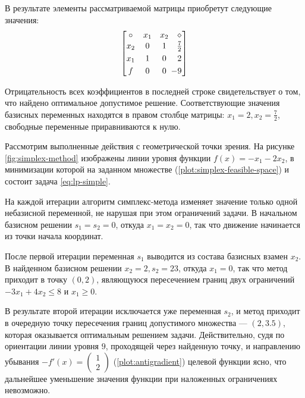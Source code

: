 В результате элементы рассматриваемой матрицы приобретут следующие
значения:
\begin{equation*}
  \begin{bmatrix}
    \circ & x_1 & x_2 & \diamond \vspace{1pt}\\
    x_2 & 0 & 1 & \frac{7}{2} \vspace{3pt}\\
    x_1 & 1 & 0 & 2 \vspace{3pt}\\
    f & 0 & 0 & \mm{9}
  \end{bmatrix}
\end{equation*}

Отрицательность всех коэффициентов в последней строке свидетельствует
о том, что найдено оптимальное допустимое решение. Соответствующие
значения базисных переменных находятся в правом столбце матрицы: $x_1
= 2, x_2 = \frac{7}{2}$, свободные переменные приравниваются к нулю.

Рассмотрим выполненные действия с геометрической точки зрения. На
рисунке \ref{fig:simplex-method} изображены линии уровня функции $f(x)
= -x_1-2x_2$, в минимизации которой на заданном множестве
(\ref{plot:simplex-feasible-space}) и состоит задача
\eqref{eq:lp-simple}.

На каждой итерации алгоритм симплекс-метода изменяет значение только
одной небазисной переменной, не нарушая при этом ограничений задачи. В
начальном базисном решении $s_1 = s_2 = 0$, откуда $x_1 = x_2 = 0$,
так что движение начинается из точки начала координат. 

После первой итерации переменная $s_1$ выводится из состава базисных
взамен $x_2$. В найденном базисном решении $x_2 = 2, s_2 = 23$, откуда
$x_1 = 0$, так что метод приходит в точку $(0, 2)$, являющуюся
пересечением границ двух ограничений $-3x_1+4x_2 \leq 8$ и $x_1 \geq
0$.

В результате второй итерации исключается уже переменная $s_2$, и метод
приходит в очередную точку пересечения границ допустимого множества —
$(2, 3.5)$, которая оказывается оптимальным решением задачи.
Действительно, судя по ориентации линии уровня $9$, проходящей через
найденную точку, и направлению убывания $-f'(x) =
\left(\begin{smallmatrix}1\\2\end{smallmatrix}\right)$
(\ref{plot:antigradient}) целевой функции ясно, что дальнейшее
уменьшение значения функции при наложенных ограничениях невозможно.

